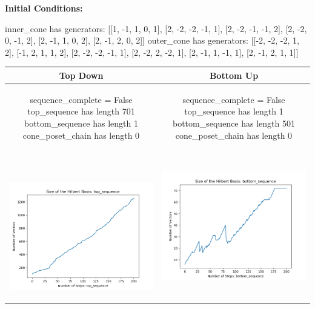 \documentclass[10pt]{article}
\begin{document}
\textbf{Initial Conditions:}
\begin{SAGE}
inner_cone has generators: 
[[1, -1, 1, 0, 1], [2, -2, -2, -1, 1], [2, -2, -1, -1, 2], [2, -2, 0, -1, 2], [2, -1, 1, 0, 2], [2, -1, 2, 0, 2]]
outer_cone has generators: 
[[-2, -2, -2, 1, 2], [-1, 2, 1, 1, 2], [2, -2, -2, -1, 1], [2, -2, 2, -2, 1], [2, -1, 1, -1, 1], [2, -1, 2, 1, 1]]

\end{SAGE}
\begin{tabular}{c|c}
\textbf{Top Down} & \textbf{Bottom Up} \\ \hline  
\begin{SAGE}
	sequence_complete = False
	top_sequence has length 701
	bottom_sequence has length 1
	cone_poset_chain has length 0
\end{SAGE} 
&
\begin{SAGE}
	sequence_complete = False
	top_sequence has length 1
	bottom_sequence has length 501
	cone_poset_chain has length 0
\end{SAGE} 
\\ \hline
\
\begin{minipage}{.45\textwidth}
\includegraphics[width=\textwidth]{"DATA/5d/6 generators 2 bound A/top_sequence SIZE"}
\end{minipage} &
\begin{minipage}{.45\textwidth}
\includegraphics[width=\textwidth]{"DATA/5d/6 generators 2 bound A bottomup/bottom_sequence SIZE"}

\end{minipage}
\end{tabular}
\end{document}
